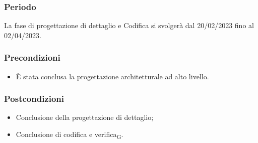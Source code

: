 \subsubsection{Periodo}
La fase di progettazione di dettaglio e Codifica si svolgerà dal 20/02/2023 fino al 02/04/2023.

\subsubsection{Precondizioni}\:
\begin{itemize}
    \item È stata conclusa la progettazione architetturale ad alto livello.
\end{itemize}

\subsubsection{Postcondizioni}\:
\begin{itemize}
    \item Conclusione della progettazione di dettaglio;
    \item Conclusione di codifica e verifica\textsubscript{G}.
\end{itemize}

